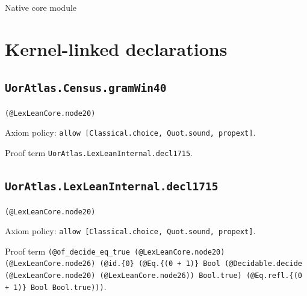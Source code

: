\documentclass[11pt]{article}
\begin{document}
\begin{center}{\LARGE Native core module}\end{center}
\section*{Kernel-linked declarations}
\subsection*{\texttt{UorAtlas.Census.gramWin40}}
\noindent\texttt{(@LexLeanCore.node20)}\par
\noindent Axiom policy: \texttt{allow [Classical.choice, Quot.sound, propext]}.\par
\noindent Proof term \texttt{UorAtlas.LexLeanInternal.decl1715}.\par
\subsection*{\texttt{UorAtlas.LexLeanInternal.decl1715}}
\noindent\texttt{(@LexLeanCore.node20)}\par
\noindent Axiom policy: \texttt{allow [Classical.choice, Quot.sound, propext]}.\par
\noindent Proof term \texttt{(@of\_decide\_eq\_true (@LexLeanCore.node20) (@LexLeanCore.node26) (@id.\{0\} (@Eq.\{(0 + 1)\} Bool (@Decidable.decide (@LexLeanCore.node20) (@LexLeanCore.node26)) Bool.true) (@Eq.refl.\{(0 + 1)\} Bool Bool.true)))}.\par
\end{document}
